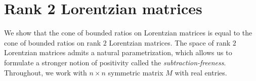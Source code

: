 \documentclass{amsart}
\theoremstyle{definition}
\theoremstyle{remark}
\begin{document}

\section{Rank 2 Lorentzian matrices}\label{sec:rank2}
%
%
%
%

We show that the cone of bounded ratios on Lorentzian matrices is equal to the cone of bounded ratios on rank $2$ Lorentzian matrices. 
The space of rank $2$ Lorentzian matrices admits a natural parametrization, which allows us 
 to formulate a stronger notion of positivity called the \emph{subtraction-freeness}. Throughout, we work with $n \times n$ symmetric matrix $M$ with real entries. %
\end{document}
